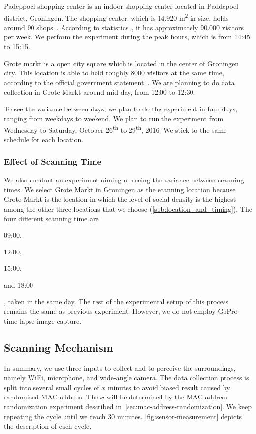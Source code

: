 Padeppoel shopping center is an indoor shopping center located in Paddepoel district, Groningen. The shopping center, which is 14.920 m\textsuperscript{2} in size, holds around 90 shops~\cite{paddepoelstat}. According to statistics~\cite{paddepoelstat}, it has approximately 90.000 visitors per week. We perform the experiment during the peak hours, which is from 14:45 to 15:15.

Grote markt is a open city square which is located in the center of Groningen city. This location is able to hold roughly 8000 visitors at the same time, according to the official government statement~\cite{GemeenteGroningen2016}. We are planning to do data collection in Grote Markt around mid day, from 12:00 to 12:30.

To see the variance between days, we plan to do the experiment in four days, ranging from weekdays to weekend. We plan to run the experiment from Wednesday to Saturday, October 26\textsuperscript{th} to 29\textsuperscript{th}, 2016. We stick to the same schedule for each location.

\subsubsection{Effect of Scanning Time} %
\label{ssub:effect_of_scanning_time}
We also conduct an experiment aiming at seeing the variance between scanning times. We select Grote Markt in Groningen as the scanning location because Grote Markt is the location in which the level of social density is the highest among the other three locations that we choose (\autoref{sub:location_and_timing}). The four different scanning time are
\begin{enumerate*}[label={\alph*)},font={\color{red!50!black}\bfseries}]
  \item 09:00,
  \item 12:00,
  \item 15:00,
  \item and 18:00
\end{enumerate*},
taken in the same day. The rest of the experimental setup of this process remains the same as previous experiment. However, we do not employ GoPro time-lapse image capture.

\subsection{Scanning Mechanism} %
\label{sub:scanning}
In summary, we use three inputs to collect and to perceive the surroundings, namely WiFi, microphone, and wide-angle camera. The data collection process is split into several small cycles of $x$ minutes to avoid biased result caused by randomized \ac{MAC} address. The $x$ will be determined by the \ac{MAC} address randomization experiment described in~\autoref{sec:mac-address-randomization}. We keep repeating the cycle until we reach 30 minutes. \autoref{fig:sensor-measurement} depicts the description of each cycle.

